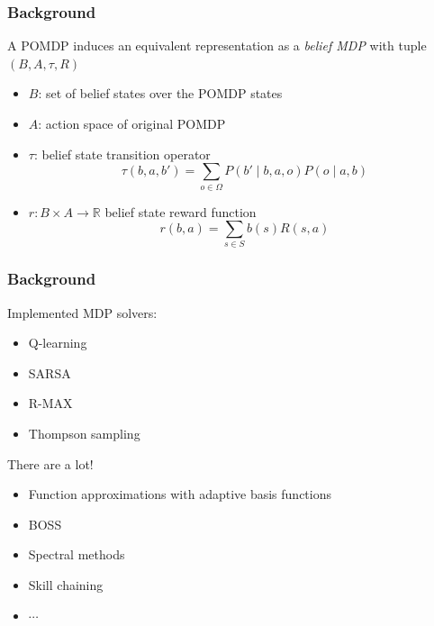\documentclass[10pt, compress]{beamer}
\begin{document}
\begin{frame}[fragile]
  \frametitle{Background}
  A POMDP induces an equivalent representation as a \emph{belief MDP} with tuple $(B, A, \tau, R)$

  \begin{itemize}
  \item $B$: set of belief states over the POMDP states
  \item $A$: action space of original POMDP
  \item $\tau$: belief state transition operator
  \begin{equation*}
  \tau(b, a, b')
  = \sum_{o\in\Omega} P(b'\mid b, a, o)P(o\mid a, b)
  \end{equation*}
  \item $r: B\times A \rightarrow \mathbb{R}$ belief state reward function
  \begin{equation*}
  r(b,a) = \sum_{s\in S}b(s)R(s,a)
  \end{equation*}
  \end{itemize}
\end{frame}

\begin{frame}[fragile]
  \frametitle{Background}

  Implemented MDP solvers:
  \begin{itemize}
  \item Q-learning
  \item SARSA
  \item R-MAX
  \item Thompson sampling
  \end{itemize}

  There are a lot!
  \begin{itemize}
  \item Function approximations with adaptive basis functions
  \item BOSS
  \item Spectral methods
  \item Skill chaining
  \item $\cdots$
  \end{itemize}

\end{frame}
\end{document}
